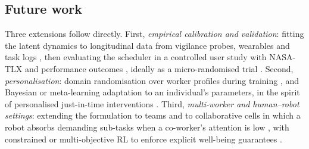 \subsection{Future work}\label{sec:future}
Three extensions follow directly. First, \emph{empirical calibration and validation}: fitting the latent dynamics to longitudinal data from vigilance probes, wearables and task logs \cite{basner2011,charles2019,shaffer2017}, then evaluating the scheduler in a controlled user study with NASA-TLX and performance outcomes \cite{hart1988}, ideally as a micro-randomised trial \cite{klasnja2015}. Second, \emph{personalisation}: domain randomisation over worker profiles during training \cite{tobin2017,zhao2020}, and Bayesian or meta-learning adaptation to an individual's parameters, in the spirit of personalised just-in-time interventions \cite{liao2020,nahumshani2018}. Third, \emph{multi-worker and human--robot settings}: extending the formulation to teams and to collaborative cells in which a robot absorbs demanding sub-tasks when a co-worker's attention is low \cite{ajoudani2018,lamon2019,zhang2022hrc,peternel2018}, with constrained or multi-objective RL to enforce explicit well-being guarantees \cite{hayes2022}.
